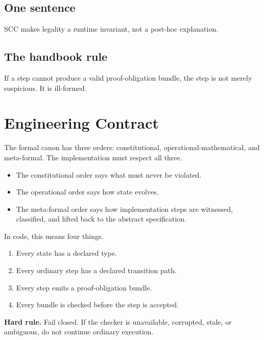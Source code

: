 \documentclass[11pt,oneside]{article}
\newenvironment{rulebox}{\begin{shaded}\noindent\textbf{Hard rule.} }{\end{shaded}}
\begin{document}
\subsection{One sentence}
SCC makes legality a runtime invariant, not a post-hoc explanation.

\subsection{The handbook rule}
If a step cannot produce a valid proof-obligation bundle, the step is not merely suspicious. It is ill-formed.

\section{Engineering Contract}
The formal canon has three orders: constitutional, operational-mathematical, and meta-formal. The implementation must respect all three.

\begin{itemize}
\item The constitutional order says what must never be violated.
\item The operational order says how state evolves.
\item The meta-formal order says how implementation steps are witnessed, classified, and lifted back to the abstract specification.
\end{itemize}

In code, this means four things.

\begin{enumerate}
\item Every state has a declared type.
\item Every ordinary step has a declared transition path.
\item Every step emits a proof-obligation bundle.
\item Every bundle is checked before the step is accepted.
\end{enumerate}

\begin{rulebox}
Fail closed. If the checker is unavailable, corrupted, stale, or ambiguous, do not continue ordinary execution.
\end{rulebox}
\end{document}
